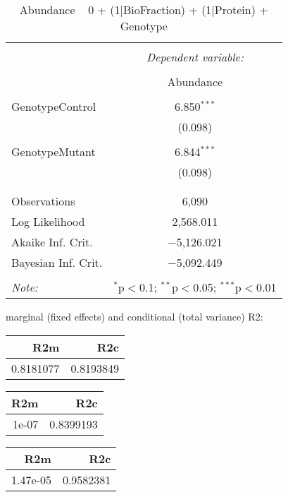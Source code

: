 \documentclass[11pt]{report}
\begin{document}
\begin{table}[!htbp] \centering 
  \caption{Abundance ~ 0 + (1|BioFraction) + (1|Protein) + Genotype} 
  \label{} 
\begin{tabular}{@{\extracolsep{5pt}}lc} 
\\[-1.8ex]\hline 
\hline \\[-1.8ex] 
 & \multicolumn{1}{c}{\textit{Dependent variable:}} \\ 
\cline{2-2} 
\\[-1.8ex] & Abundance \\ 
\hline \\[-1.8ex] 
 GenotypeControl & 6.850$^{***}$ \\ 
  & (0.098) \\ 
  & \\ 
 GenotypeMutant & 6.844$^{***}$ \\ 
  & (0.098) \\ 
  & \\ 
\hline \\[-1.8ex] 
Observations & 6,090 \\ 
Log Likelihood & 2,568.011 \\ 
Akaike Inf. Crit. & $-$5,126.021 \\ 
Bayesian Inf. Crit. & $-$5,092.449 \\ 
\hline 
\hline \\[-1.8ex] 
\textit{Note:}  & \multicolumn{1}{r}{$^{*}$p$<$0.1; $^{**}$p$<$0.05; $^{***}$p$<$0.01} \\ 
\end{tabular} 
\end{table} 
marginal (fixed effects) and conditional (total variance) R2:

\begin{tabular}{r|r}
\hline
R2m & R2c\\
\hline
0.8181077 & 0.8193849\\
\hline
\end{tabular}

\begin{tabular}{r|r}
\hline
R2m & R2c\\
\hline
1e-07 & 0.8399193\\
\hline
\end{tabular}

\begin{tabular}{r|r}
\hline
R2m & R2c\\
\hline
1.47e-05 & 0.9582381\\
\hline
\end{tabular}
\end{document}
